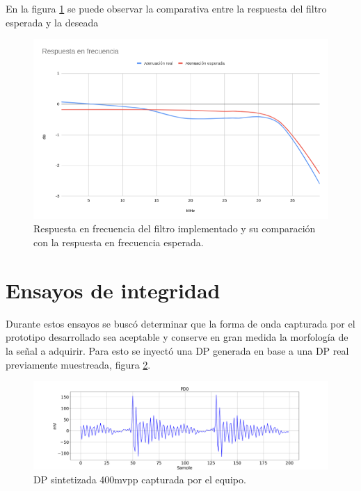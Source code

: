 \vspace{5mm}

En la figura \ref{fig:respFrecReal} se puede observar la comparativa entre la respuesta del filtro esperada y la deseada

\vspace{5mm}

\begin{figure}[ht]
	\centering
	\includegraphics[width=140mm]{./Figures/respFrecReal.png}
	\caption{Respuesta en frecuencia del filtro implementado y su comparación con la respuesta en frecuencia esperada.}
	\label{fig:respFrecReal}
\end{figure}

\vspace{10mm}

\section{Ensayos de integridad}


Durante estos ensayos se buscó determinar que la forma de onda capturada por el prototipo desarrollado sea aceptable y conserve en gran medida la morfología de la señal a adquirir. Para esto se inyectó una DP generada en base a una DP real previamente muestreada, figura \ref{fig:dpSint}.

\vspace{5mm}

\begin{figure}[htpb]
	\hspace{-1.2cm}
	\includegraphics[width=165mm]{./Figures/dpSint.png}
	\caption{DP sintetizada 400mvpp capturada por el equipo.}
	\label{fig:dpSint}
\end{figure}

